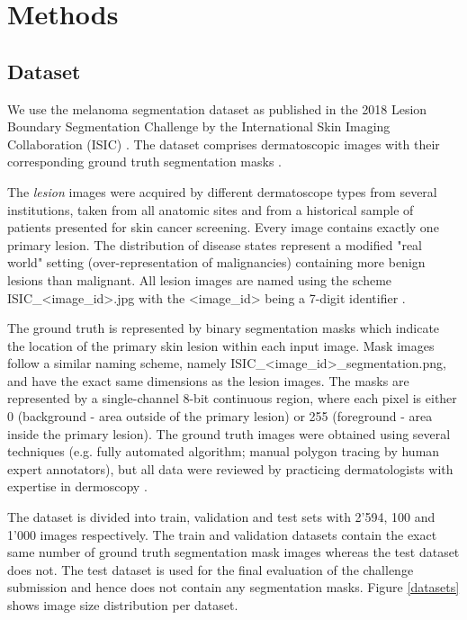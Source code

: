 \section{Methods}

\subsection{Dataset}
We use the melanoma segmentation dataset as published in the 2018 Lesion Boundary Segmentation Challenge by the International Skin Imaging Collaboration (ISIC) \citep{isic-2018-segmentation}. The dataset comprises dermatoscopic images with their corresponding ground truth segmentation masks \citep{ensambles-2016-codella}.

\par
The \emph{lesion} images were acquired by different dermatoscope types from several institutions, taken from all anatomic sites and from a historical sample of patients presented for skin cancer screening. Every image contains exactly one primary lesion. The distribution of disease states represent a modified "real world" setting (over-representation of malignancies) containing more benign lesions than malignant. All lesion images are named using the scheme ISIC\_\textless{image}\_id\textgreater{.jpg} with the \textless{image}\_id\textgreater{} being a 7-digit identifier \citep{isic-2018-segmentation}.

\par
The ground truth is represented by binary segmentation masks which indicate the location of the primary skin lesion within each input image. Mask images follow a similar naming scheme, namely  ISIC\_\textless{image\_id}\textgreater{\_segmentation.png}, and have the exact same dimensions as the lesion images. The masks are represented by a single-channel 8-bit continuous region, where each pixel is either 0 (background - area outside of the primary lesion) or 255 (foreground - area inside the primary lesion). The ground truth images were obtained using several techniques (e.g. fully automated algorithm; manual polygon tracing by human expert annotators), but all data were reviewed by practicing dermatologists with expertise in dermoscopy \citep{isic-2018-segmentation,ensambles-2016-codella}.

\par
The dataset is divided into train, validation and test sets with 2’594, 100 and 1’000 images respectively. The train and validation datasets contain the exact same number of ground truth segmentation mask images whereas the test dataset does not. The test dataset is used for the final evaluation of the challenge submission and hence does not contain any segmentation masks. Figure \ref{datasets} shows image size distribution per dataset.

